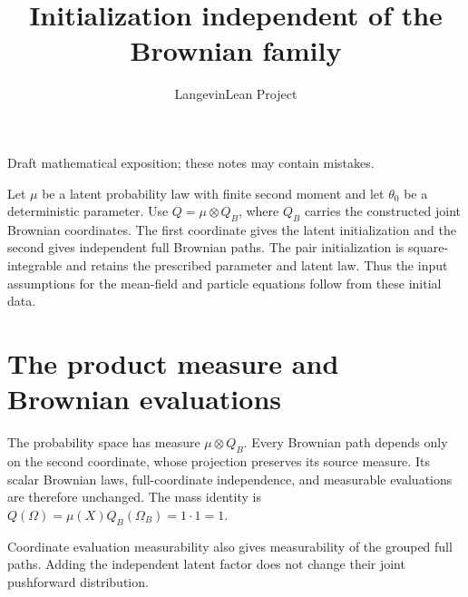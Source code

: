 \documentclass[11pt,a4paper]{article}
\title{\texorpdfstring{Initialization independent of the Brownian family}{Initialization independent of the Brownian family}}
\author{LangevinLean Project}
\date{}
\begin{document}
\maketitle
Draft mathematical exposition; these notes may contain mistakes.


Let \(\mu\) be a latent probability law with finite second moment and let \(\theta_0\) be a deterministic parameter. Use \(Q=\mu\otimes Q_B\), where \(Q_B\) carries the constructed joint Brownian coordinates. The first coordinate gives the latent initialization and the second gives independent full Brownian paths. The pair initialization is square-integrable and retains the prescribed parameter and latent law. Thus the input assumptions for the mean-field and particle equations follow from these initial data.


\section{\texorpdfstring{The product measure and Brownian evaluations}{The product measure and Brownian evaluations}}


The probability space has measure \(\mu\otimes Q_B\). Every Brownian path depends only on the second coordinate, whose projection preserves its source measure. Its scalar Brownian laws, full-coordinate independence, and measurable evaluations are therefore unchanged. The mass identity is \(Q(\Omega)=\mu(X)Q_B(\Omega_B)=1\cdot1=1\).



Coordinate evaluation measurability also gives measurability of the grouped full paths. Adding the independent latent factor does not change their joint pushforward distribution.
\end{document}
